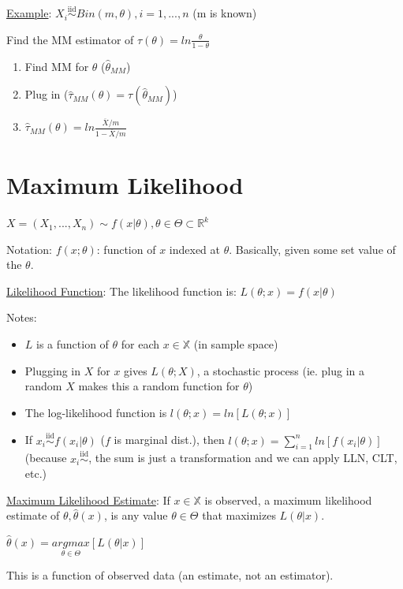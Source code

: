 \documentclass{article}
\newcommand{\real}{\mathbb{R}} %
\let\Oldsum=\sum
\renewcommand{\sum}{\Oldsum\limits}
\newcommand{\iiddist}{\overset{\mathrm{iid}}{\sim}}
\begin{document}
\underline{Example}: $X_i \iiddist Bin(m, \theta), i=1,...,n$ (m is known)

Find the MM estimator of $\tau(\theta) = ln\frac{\theta}{1-\theta}$
\begin{enumerate}
    \item Find MM for $\theta$ ($\hat{\theta}_{MM}$)
    \item Plug in ($\hat{\tau}_{MM}(\theta) = \tau(\hat{\theta}_{MM})$)
    \item $\hat{\tau}_{MM}(\theta) = ln\frac{\overline{X}/m}{1-\overline{X}/m}$
\end{enumerate}

\newpage
\section{Maximum Likelihood}

$X = (X_1, ..., X_n) \sim f(x|\theta), \theta \in \Theta \subset \real^k$

Notation: $f(x;\theta)$: function of $x$ indexed at $\theta$. Basically, given some set value of the $\theta$.

\underline{Likelihood Function}: The likelihood function is: $L(\theta;x) = f(x|\theta)$

Notes: 
\begin{itemize}
    \item $L$ is a function of $\theta$ for each $x \in \mathbb{X}$ (in sample space)
    \item Plugging in $X$ for $x$ gives $L(\theta;X)$, a stochastic process (ie. plug in a random $X$ makes this a random function for $\theta$)
    \item The log-likelihood function is $l(\theta;x) = ln [L(\theta;x)]$
    \item If $x_i \iiddist f(x_i | \theta)$ ($f$ is marginal dist.), then $l(\theta;x) = \sum_{i=1}^{n} ln [f(x_i|\theta)]$ (because $x_i \iiddist$, the sum is just a transformation and we can apply LLN, CLT, etc.)
\end{itemize}

\underline{Maximum Likelihood Estimate}: If $x \in \mathbb{X}$ is observed, a maximum likelihood estimate of $\theta, \hat{\theta}(x)$, is any value $\theta \in \Theta$ that maximizes $L(\theta|x)$.

$\hat{\theta}(x) = \underset{\theta \in \Theta}{argmax} [ L(\theta|x) ]$

This is a function of observed data (an estimate, not an estimator). 
\end{document}
